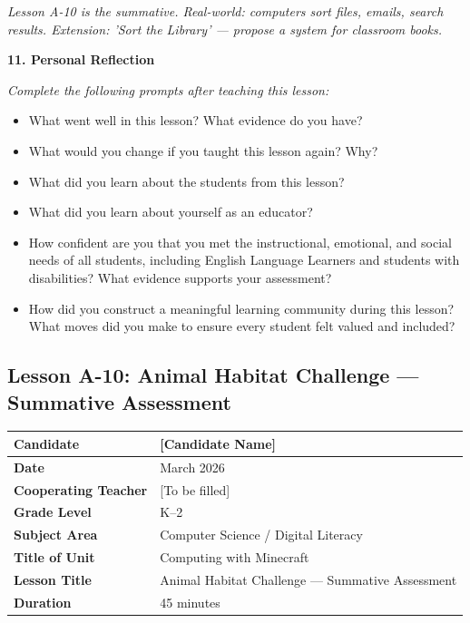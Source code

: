\documentclass[11pt,letterpaper]{article}
\begin{document}
\textit{Lesson A-10 is the summative. Real-world: computers sort files, emails, search results. Extension: 'Sort the Library' --- propose a system for classroom books.}

\textbf{11. Personal Reflection}

\textit{Complete the following prompts after teaching this lesson:}

\begin{itemize}
  \item What went well in this lesson? What evidence do you have?

  \item What would you change if you taught this lesson again? Why?

  \item What did you learn about the students from this lesson?

  \item What did you learn about yourself as an educator?

  \item How confident are you that you met the instructional, emotional, and social needs of all students, including English Language Learners and students with disabilities? What evidence supports your assessment?

  \item How did you construct a meaningful learning community during this lesson? What moves did you make to ensure every student felt valued and included?
\end{itemize}

\newpage
\subsection{Lesson A-10: Animal Habitat Challenge --- Summative Assessment}
\label{sub:LessonA10AnimalHabitatChallengeSummativeAssessment}

\begin{longtable}{|L{0.28\textwidth}|L{0.65\textwidth}|}
\hline
\textbf{Candidate}  & [Candidate Name]  \\
\hline
\textbf{Date}  & March 2026  \\
\hline
\textbf{Cooperating Teacher}  & [To be filled]  \\
\hline
\textbf{Grade Level}  & K--2  \\
\hline
\textbf{Subject Area}  & Computer Science / Digital Literacy  \\
\hline
\textbf{Title of Unit}  & Computing with Minecraft  \\
\hline
\textbf{Lesson Title}  & Animal Habitat Challenge --- Summative Assessment  \\
\hline
\textbf{Duration}  & 45 minutes  \\
\hline
\end{longtable}
\end{document}
